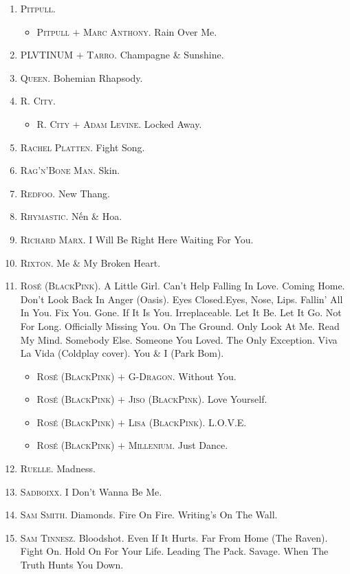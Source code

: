 \documentclass[oneside]{book}
\numberwithin{equation}{section}
\begin{document}
\begin{enumerate}
	\item \textsc{Pitpull.}
	\begin{itemize}
		\item \textsc{Pitpull $+$ Marc Anthony.} Rain Over Me.
	\end{itemize}
	\item \textsc{PLVTINUM $+$ Tarro.} Champagne \& Sunshine.
	\item \textsc{Queen.} Bohemian Rhapsody.
	\item \textsc{R. City.}
	\begin{itemize}
		\item \textsc{R. City $+$ Adam Levine.} Locked Away.
	\end{itemize}
	\item \textsc{Rachel Platten.} Fight Song.
	\item \textsc{Rag'n'Bone Man.} Skin.
	\item \textsc{Redfoo.} New Thang.
	\item \textsc{Rhymastic.} Nến \& Hoa.
	\item \textsc{Richard Marx.} I Will Be Right Here Waiting For You.
	\item \textsc{Rixton.} Me \& My Broken Heart.
	\item \textsc{Ros\'e (BlackPink).} A Little Girl. Can't Help Falling In Love. Coming Home. Don't Look Back In Anger (Oasis). Eyes Closed.Eyes, Nose, Lips. Fallin' All In You. Fix You. Gone. If It Is You. Irreplaceable. Let It Be. Let It Go. Not For Long. Officially Missing You. On The Ground. Only Look At Me. Read My Mind. Somebody Else. Someone You Loved. The Only Exception. Viva La Vida (Coldplay cover). You \& I (Park Bom).
	\begin{itemize}
		\item \textsc{Ros\'e (BlackPink) $+$ G-Dragon.} Without You.
		\item \textsc{Ros\'e (BlackPink) $+$ Jiso (BlackPink).} Love Yourself.
		\item \textsc{Ros\'e (BlackPink) $+$ Lisa (BlackPink).} L.O.V.E.
		\item \textsc{Ros\'e (BlackPink) $+$ Millenium.} Just Dance.
	\end{itemize}
	\item \textsc{Ruelle.} Madness.
	\item \textsc{Sadboixx.} I Don't Wanna Be Me.
	\item \textsc{Sam Smith.} Diamonds. Fire On Fire. Writing's On The Wall.
	\item \textsc{Sam Tinnesz.} Bloodshot. Even If It Hurts. Far From Home (The Raven). Fight On. Hold On For Your Life. Leading The Pack. Savage. When The Truth Hunts You Down.

\end{enumerate}
\end{document}

